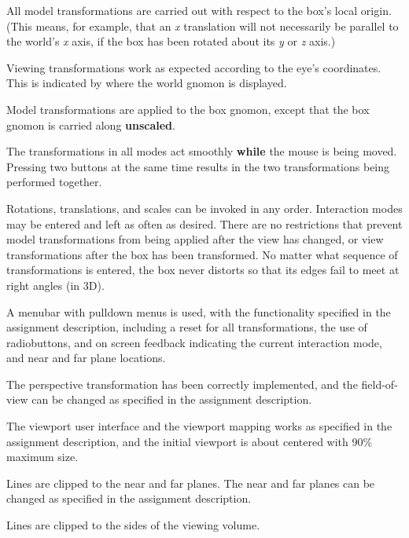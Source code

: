 \begin{description}\small
\item[\_\_\_ 1:]
        All model transformations are carried out with respect 
        to the box's local origin.  (This means, for example, 
        that an {\it x} translation will not necessarily be 
        parallel to the world's {\it x} axis, if the box has been 
        rotated about its {\it y} or {\it z} axis.)
\item[\_\_\_ 2:]
        Viewing transformations work as expected according
        to the eye's coordinates.  This is indicated by where
        the world gnomon is displayed.
\item[\_\_\_ 3:]
        Model transformations are applied to the box gnomon, except
        that the box gnomon is carried along {\bf unscaled}.
\item[\_\_\_ 4:]
        The transformations in all modes act smoothly {\bf while} the
        mouse is being moved.
        Pressing two buttons at the same time results in the two 
        transformations being performed together.
\item[\_\_\_ 5:]
        Rotations, translations, and scales can be invoked in any order.
        Interaction modes may be entered and left as often as desired.
        There are no restrictions that prevent model transformations
        from being applied after the view has changed, or view 
        transformations after the box has been transformed.
        No matter what sequence of transformations is entered,
        the box never distorts so that its edges fail to meet at right angles 
        (in 3D).
\item[\_\_\_ 6:]
        A menubar with pulldown menus is used, with the functionality
        specified in the assignment description, including a reset 
        for all transformations, the use of radiobuttons,
        and on screen feedback indicating the current interaction mode,
        and near and far plane locations.
\item[\_\_\_ 7:]
	The perspective transformation has been correctly implemented,
	and the field-of-view can be changed as specified in the 
        assignment description.
\item[\_\_\_ 8:]
	The viewport user interface and the viewport mapping works 
        as specified in the assignment description, and the initial
        viewport is about centered with 90\% maximum size.
\item[\_\_\_ 9:]
        Lines are clipped to the near and far planes.  The near and
        far planes can be changed as specified in the assignment
        description.
\item[\_\_\_ 10:]
        Lines are clipped to the sides of the viewing volume.

\end{description}



